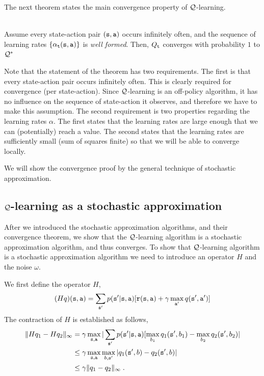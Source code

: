 The next theorem states the main convergence property of
$\mathcal{Q}$-learning.
\begin{theorem}\ \\
\label{thm:Q-learning} Assume every state-action pair
$({\tt s},{\tt a})$ occurs infinitely often, and the sequence of learning rates $\{\alpha_{\tt t}({\tt s},{\tt a})\}$ is \emph{well formed}.
Then, $Q_{\tt t}$ converges with probability $1$ to $\mathcal{Q}^*$
\end{theorem}

Note that the statement of the theorem has two requirements. The
first is that every state-action pair occurs infinitely often.
This is clearly required for convergence (per state-action). Since
$\mathcal{Q}$-learning is an off-policy algorithm, it has no influence on the sequence
of state-action it observes, and therefore we have to make this
assumption. The second requirement is two properties regarding the
learning rates $\alpha$. The first states that the learning rates
are large enough that we can (potentially) reach a value. The
second states that the learning rates are sufficiently small (sum of
squares finite) so that we will be able to converge locally.

We will show the convergence proof by the general technique
of stochastic approximation. 




\subsection{$\mathcal{Q}$-learning as a stochastic approximation}

After we introduced the stochastic approximation algorithms, and
their convergence theorem, we show that the $\mathcal{Q}$-learning algorithm
is a stochastic approximation algorithm, and thus converges.
%
To show that $\mathcal{Q}$-learning algorithm is a stochastic approximation
algorithm we need to introduce an operator $H$ and the noise
$\omega$.

We first define the operator $H$,
\[
(Hq)({\tt s},{\tt a})=\sum_{{\tt s}'}p({\tt s}'|{\tt s},{\tt a})
[{\tt r}({\tt s},{\tt a}) + \gamma \max_{{\tt a}'} q ({\tt s}',
{\tt a}')]
\]
The contraction of $H$ is established as follows,
\begin{align*}
\|Hq_1-Hq_2\|_\infty &= \gamma \max_{{\tt s},{\tt a}}
|\sum_{{\tt s}'} p({\tt s}'|{\tt s},{\tt a})
[\max_{b_1} q_1({\tt s}',b_1)-\max_{b_2} q_2({\tt s}',b_2)|\\
&\leq \gamma \max_{{\tt s},{\tt a}}\max_{b,{\tt s}'} |q_1({\tt s}',b)-q_2({\tt s}',b)|\\
&\leq \gamma \|q_1-q_2\|_\infty\;.
\end{align*}


